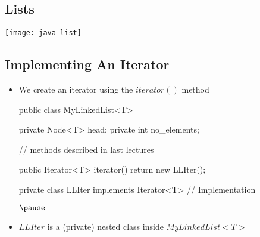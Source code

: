
\begin{slide}
\section{Lists}
\vspace{-1cm}
\begin{center}
  \texttt{[image: java-list]}
\end{center}
\vspace{-1cm}
\end{slide}


\Outline

\begin{slide}
\section[-2]{Implementing An Iterator}

\begin{PauseHighLight}
  \begin{itemize}
  \item We create an iterator using the \jl$iterator()$ method
\begin{java}
public class MyLinkedList<T>
{
    private Node<T> head;
    private int no_elements;

    // methods described in last lectures

    public Iterator<T> iterator()
    {
        return new LLIter();
    }

    private class LLIter implements Iterator<T>
    {
        // Implementation
    }
}$\pause$
\end{java}\vspace{-1cm}
  \item \jl$LLIter$ is a (private) nested class inside
  \jl$MyLinkedList<T>$\pause
  \end{itemize}
\end{PauseHighLight}
\end{slide}


